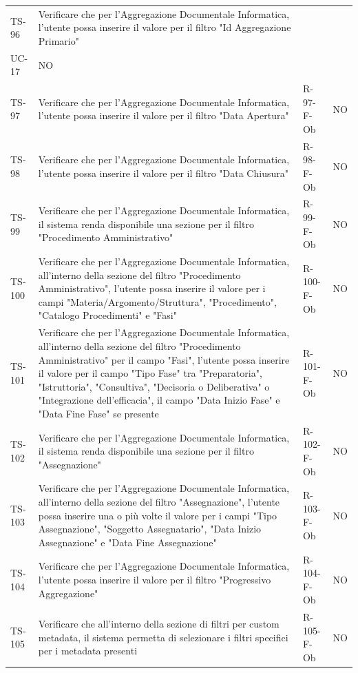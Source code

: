 \documentclass[a4paper,12pt]{article}
\begin{document}
\begin{longtable}{|p{1.5cm}|p{8.3cm}|p{2.4cm}|c|}
\hline
TS-96 & Verificare che per l'Aggregazione Documentale Informatica, l'utente possa inserire il valore per il filtro "Id Aggregazione Primario" & \begin{tabular}[t]{@{}l} R-96-F-Ob \\ UC-17 \end{tabular} & NO \\
\hline
TS-97 & Verificare che per l'Aggregazione Documentale Informatica, l'utente possa inserire il valore per il filtro "Data Apertura" & R-97-F-Ob & NO \\
\hline
TS-98 & Verificare che per l'Aggregazione Documentale Informatica, l'utente possa inserire il valore per il filtro "Data Chiusura" & R-98-F-Ob & NO \\
\hline
TS-99 & Verificare che per l'Aggregazione Documentale Informatica, il sistema renda disponibile una sezione per il filtro "Procedimento Amministrativo" & R-99-F-Ob & NO \\
\hline
TS-100 & Verificare che per l'Aggregazione Documentale Informatica, all'interno della sezione del filtro "Procedimento Amministrativo", l'utente possa inserire il valore per i campi "Materia/Argomento/Struttura", "Procedimento", "Catalogo Procedimenti" e "Fasi" & R-100-F-Ob & NO \\
\hline
TS-101 & Verificare che per l'Aggregazione Documentale Informatica, all'interno della sezione del filtro "Procedimento Amministrativo" per il campo "Fasi", l'utente possa inserire il valore per il campo "Tipo Fase" tra "Preparatoria", "Istruttoria", "Consultiva", "Decisoria o Deliberativa" o "Integrazione dell'efficacia", il campo "Data Inizio Fase" e "Data Fine Fase" se presente & R-101-F-Ob & NO \\
\hline
TS-102 & Verificare che per l'Aggregazione Documentale Informatica, il sistema renda disponibile una sezione per il filtro "Assegnazione" & R-102-F-Ob & NO \\
\hline
TS-103 & Verificare che per l'Aggregazione Documentale Informatica, all'interno della sezione del filtro "Assegnazione", l'utente possa inserire una o più volte il valore per i campi "Tipo Assegnazione", "Soggetto Assegnatario", "Data Inizio Assegnazione" e "Data Fine Assegnazione" & R-103-F-Ob & NO \\
\hline
TS-104 & Verificare che per l'Aggregazione Documentale Informatica, l'utente possa inserire il valore per il filtro "Progressivo Aggregazione" & R-104-F-Ob & NO \\
\hline
TS-105 & Verificare che all'interno della sezione di filtri per custom metadata, il sistema permetta di selezionare i filtri specifici per i metadata presenti & R-105-F-Ob & NO \\

\end{longtable}
\end{document}
